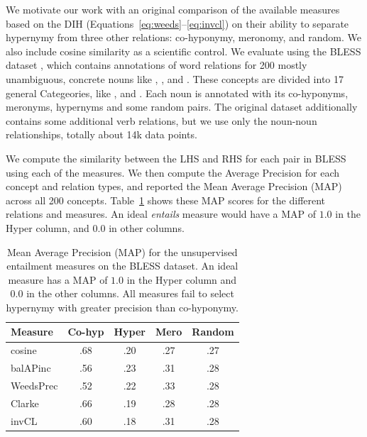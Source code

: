 We motivate our work with an original comparison of the available measures
based on the DIH (Equations~\ref{eq:weeds}--\ref{eq:invcl}) on their ability to
separate hypernymy from three other relations: co-hyponymy, meronomy, and
random. We also include cosine similarity as a scientific control.
We evaluate using the BLESS dataset \cite{baroni:2011:gems},
which contains annotations of word relations for 200 mostly unambiguous, concrete
nouns like , , and . These concepts are divided
into 17 general Categeories, like ,  and
. Each noun is annotated with its co-hyponyms, meronyms,
hypernyms and some random pairs. The original dataset additionally contains
some additional verb relations, but we use only the noun-noun relationships,
totally about 14k data points.

We compute the similarity between the LHS and RHS for each pair in BLESS using
each of the measures.  We then compute the Average Precision for each concept
and relation types, and reported the Mean Average Precision (MAP) across all
200 concepts.  Table~\ref{tab:mapscores1} shows these MAP scores for the
different relations and measures. An ideal {\em entails} measure would have a
MAP of $1.0$ in the Hyper column, and $0.0$ in other columns.

\begin{table}
  \centering
  \begin{small}
  \begin{tabular}{|l|cccc|}
    \hline
    Measure        & Co-hyp  & Hyper  & Mero  & Random  \\
    \hline
    cosine         &   .68   &   .20  &  .27  &    .27  \\
    balAPinc       &   .56   &   .23  &  .31  &    .28  \\
    WeedsPrec      &   .52   &   .22  &  .33  &    .28  \\
    Clarke         &   .66   &   .19  &  .28  &    .28  \\
    invCL          &   .60   &   .18  &  .31  &    .28  \\
    \hline
  \end{tabular}
  \end{small}
  \caption{Mean Average Precision (MAP)  for the unsupervised entailment
    measures on the BLESS dataset. An ideal measure has a MAP of $1.0$ in the
    Hyper column and $0.0$ in the other columns. All measures fail to select
    hypernymy with greater precision than co-hyponymy.}
  \label{tab:mapscores1}
\end{table}

